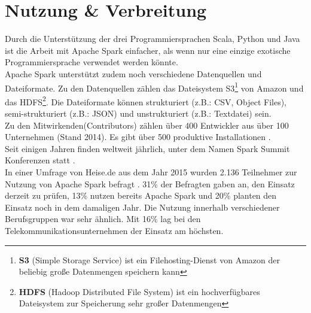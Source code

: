 \newpage
\section{Nutzung \& Verbreitung}
Durch die Unterstützung der drei Programmiersprachen Scala, Python und Java ist die Arbeit mit Apache Spark einfacher, als wenn nur eine einzige exotische Programmiersprache verwendet werden könnte. \\



\noindent
Apache Spark unterstützt zudem noch verschiedene Datenquellen und Dateiformate.  Zu den Datenquellen zählen das Dateisystem S3\footnote{\textbf{S3} (Simple Storage Service) ist ein Filehosting-Dienst von Amazon der beliebig große Datenmengen speichern kann} von Amazon und das HDFS\footnote{\textbf{HDFS} (Hadoop Distributed File System) ist ein hochverfügbares Dateisystem zur Speicherung sehr großer Datenmengen}.
Die Dateiformate können strukturiert (z.B.: CSV, Object Files), semi-strukturiert (z.B.: JSON) und unstrukturiert (z.B.: Textdatei) sein.\\

\noindent
Zu den Mitwirkenden(Contributors) zählen über 400 Entwickler aus über 100 Unternehmen (Stand 2014). Es gibt über 500 produktive Installationen \cite{ADD+15}. \\ %

\noindent
Seit einigen Jahren finden weltweit jährlich, unter dem Namen \glqq{}Spark Summit\grqq{} Konferenzen statt \cite{SPCOM}. \\



\noindent
In einer Umfrage von Heise.de aus dem Jahr 2015 wurden 2.136 Teilnehmer zur Nutzung von Apache Spark befragt \cite{HEISEBIGDATA}. 31\% der Befragten gaben an, den Einsatz derzeit zu prüfen, 13\% nutzen bereits Apache Spark und 20\% planten den Einsatz noch in dem damaligen Jahr. Die Nutzung innerhalb verschiedener Berufsgruppen war sehr ähnlich. Mit 16\%  lag bei den Telekommunikationsunternehmen der Einsatz am höchsten.\\

